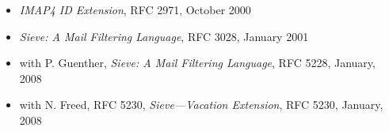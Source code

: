 \documentclass[letterpaper,12pt,twoside]{article}
\begin{document}
\vspace{-6pt}
\begin{itemize}
\item {\sl IMAP4 ID Extension}, RFC 2971, October 2000
\item {\sl Sieve: A Mail Filtering Language}, RFC 3028, January 2001
\item with P. Guenther, {\sl Sieve: A Mail Filtering Language}, RFC
  5228, January, 2008
\item with N. Freed, RFC 5230, {\sl Sieve---Vacation Extension}, RFC
  5230, January, 2008
\end{itemize}
\end{document}
